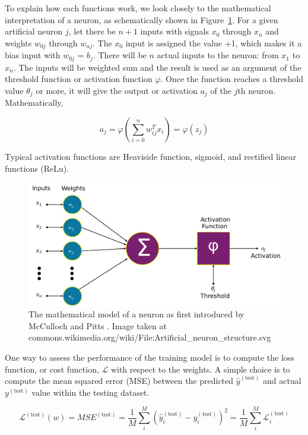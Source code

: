 To explain how each functions work, we look closely to the mathematical
interpretation of a neuron, as schematically shown in
Figure~\ref{fig:neuron_struc}. For a given artificial neuron $j$, let there be
$n+1$ inputs with signals $x_0$ through $x_n$ and weights $w_{0j}$ through
$w_{nj}$. The $x_0$ input is assigned the value +1, which makes it a bias input
with $w_{0j}$ = $b_j$. There will be $n$ actual inputs to the neuron: from
$x_1$ to $x_n$. The inputs will be weighted sum and the result is used as an
argument of the threshold function or activation function $\varphi$. Once the
function reaches a threshold value $\theta_j$ or more, it will give the output
or activation $a_j$ of the  $j$th neuron. Mathematically,

\begin{equation} \label{eq:activation_funct}
    a_j =   \varphi \left(\sum_{i=0}^{n} w_{ij}^T x_i \right) =  \varphi
    \left( z_{j}\right)
\end{equation}

Typical activation functions are Heaviside function, sigmoid, and rectified
linear functions (ReLu).

\begin{figure}[h!]
    \centering
    \includegraphics[width=0.5\linewidth]{images/artificial_neuron.pdf}
    \caption{The mathematical model of a neuron as first introduced by
        McCulloch and Pitts \cite{mcculloch1943logical}. Image taken at
        commons.wikimedia.org/wiki/File:Artificial\_neuron\_structure.svg}
    \label{fig:neuron_struc}
\end{figure}

One way to assess the performance of the training model is to compute the loss
function, or cost function, $\mathcal{L}$ with respect to the weights. A simple
choice is to compute the mean squared error
(MSE)
between the predicted $\hat{y}^{(\text{test})}$ and actual $y^{(\text{test})}$
value within the testing
dataset.

\begin{equation}
    \mathcal{L}^{(\text{test})}(w) = MSE^{(\text{test})} = \frac{1}{M} \sum_i^M
    \left(
    \hat{y}_i^{(\text{test})} -
    y_i^{(\text{test})} \right)^2  = \frac{1}{M} \sum_i^M
    \mathcal{L}^{(\text{test})}_i
\end{equation}

